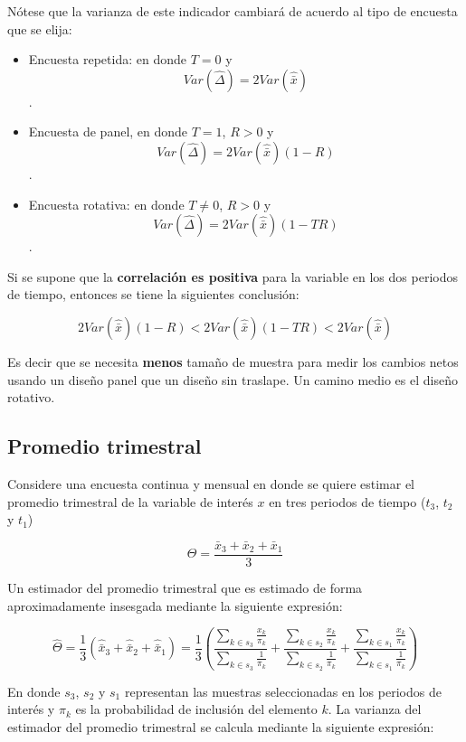 \documentclass[12pt,spanish,]{book}
\providecommand{\tightlist}{%
  \setlength{\itemsep}{0pt}\setlength{\parskip}{0pt}}
\begin{document}
Nótese que la varianza de este indicador cambiará de acuerdo al tipo de encuesta que se elija:

\begin{itemize}
\tightlist
\item
  Encuesta repetida: en donde \(T=0\) y
  \[Var(\hat{\Delta}) = 2Var(\hat{\bar{x}})\].
\item
  Encuesta de panel, en donde \(T=1\), \(R > 0\) y
  \[Var(\hat{\Delta}) = 2Var(\hat{\bar{x}})(1-R)\].
\item
  Encuesta rotativa: en donde \(T\neq 0\), \(R > 0\) y
  \[Var(\hat{\Delta}) = 2Var(\hat{\bar{x}})(1-TR)\].
\end{itemize}

Si se supone que la \textbf{correlación es positiva} para la variable en los dos periodos de tiempo, entonces se tiene la siguientes conclusión:

\[
2Var(\hat{\bar{x}})(1-R) < 2Var(\hat{\bar{x}})(1-TR) < 2Var(\hat{\bar{x}})
\]

Es decir que se necesita \textbf{menos} tamaño de muestra para medir los cambios netos usando un diseño panel que un diseño sin traslape. Un camino medio es el diseño rotativo.

\hypertarget{promedio-trimestral}{%
\subsection*{Promedio trimestral}\label{promedio-trimestral}}

Considere una encuesta continua y mensual en donde se quiere estimar el promedio trimestral de la variable de interés \(x\) en tres periodos de tiempo (\(t_3\), \(t_2\) y \(t_1\))

\[
\Theta = \frac{\bar{x}_3 + \bar{x}_2 + \bar{x}_1}{3}
\]

Un estimador del promedio trimestral que es estimado de forma aproximadamente insesgada mediante la siguiente expresión:

\[
\hat{\Theta} = \frac{1}{3} \left( \hat{\bar{x}}_3 + \hat{\bar{x}}_2 + \hat{\bar{x}}_1 \right)
= \frac{1}{3}\left( \frac{\sum_{k\in s_3}\frac{x_{k}}{\pi_k}}{\sum_{k\in s_3}\frac{1}{\pi_k}} + \frac{\sum_{k\in s_2}\frac{x_{k}}{\pi_k}}{\sum_{k\in s_2}\frac{1}{\pi_k}} + \frac{\sum_{k\in s_1}\frac{x_{k}}{\pi_k}}{\sum_{k\in s_1}\frac{1}{\pi_k}} \right)
\]

En donde \(s_3\), \(s_2\) y \(s_1\) representan las muestras seleccionadas en los periodos de interés y \(\pi_k\) es la probabilidad de inclusión del elemento \(k\). La varianza del estimador del promedio trimestral se calcula mediante la siguiente expresión:
\end{document}
